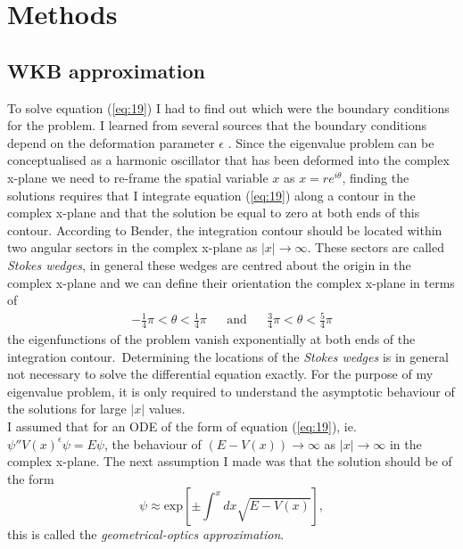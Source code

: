 \documentclass[10pt, a4paper, singlespacing, headsepline]{report}
\begin{document}
\section{Methods}
\subsection{WKB approximation}\label{WKB}
To solve equation (\ref{eq:19}) I had to find out which were the boundary conditions for the problem. I learned from several sources that the boundary conditions depend on the deformation parameter $\epsilon$ \cite{BenderPT}\cite{Bender}\cite{Bender2017}. Since the eigenvalue problem can be conceptualised as a harmonic oscillator that has been deformed into the complex x-plane we need to re-frame the spatial variable $x$ as $x = r e^{i\theta}$, finding the solutions requires that I integrate equation (\ref{eq:19}) along a contour in the complex x-plane and that the solution be equal to zero at both ends of this contour\cite{BenderPT}. According to Bender, the integration contour should be located within two angular sectors in the complex x-plane as $|x| \rightarrow \infty$. These sectors are called \emph{Stokes wedges}\cite{BenderPT}\cite{Bender}, in general these wedges are centred about the origin in the complex x-plane and we can define their orientation the complex x-plane in terms of
\begin{align} \label{eq:20}
&-\frac{1}{4} \pi  < \theta < \frac{1}{4}\pi& &\mathrm{and}& &\frac{3}{4} \pi  < \theta < \frac{5}{4}\pi& 
\end{align}
the eigenfunctions of the problem vanish exponentially at both ends of the integration contour.\
Determining the locations of the \emph{Stokes wedges} is in general not necessary to solve the differential equation exactly\cite{BenderPT}. For the purpose of my eigenvalue problem, it is only required to understand the asymptotic behaviour of the solutions for large $|x|$ values.\\
I assumed that for an ODE of the form of equation (\ref{eq:19}), ie. \mbox{$\psi'' V(x)^{\epsilon} \psi = E \psi$}, the behaviour of $(E - V(x)) \rightarrow \infty$ as $|x| \rightarrow \infty$ in the complex x-plane. The next assumption I made was that the solution should be of the form
\begin{equation} \label{eq:21}
\psi \approx \mathrm{exp}[\pm  \int^{x}dx \sqrt{E - V(x)}],
\end{equation}
this is called the \emph{geometrical-optics approximation}\cite{BenderPT}.\\ 
\end{document}
